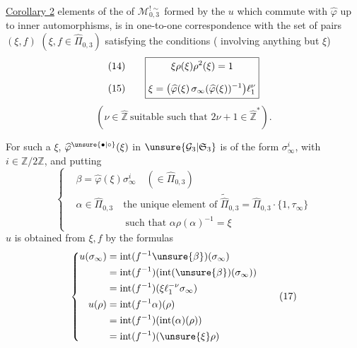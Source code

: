 
\uline{Corollary 2}  elements of the  of
$\mathcal M_{0,3}^{!\sim}$ formed by the $u$ which commute with
$\widehat\varphi$ up to inner automorphisms, is  in one-to-one correspondence with
the set of pairs $(\xi,f)$ \deleted{\unsure{$\in$}}
$(\xi,f\in\widehat\Pi_{0,3})$ satisfying the conditions
( involving anything but $\xi$)
\[
\begin{array}{c@{\qquad}c}
\begin{gathered}(14)\\[1.8ex](15)\end{gathered}
&
\boxed{\begin{gathered}
\xi\rho(\xi)\rho^2(\xi)=1\\[1.8ex]
\xi=\bigl(\widehat\varphi(\xi)\,
\sigma_\infty(\widehat\varphi(\xi))^{-1}\bigr)\ell_1^\nu
\end{gathered}}
\end{array}
\]
\[
(\nu\in\widehat{\mathbb Z}\ \text{suitable such that }
2\nu+1\in\widehat{\mathbb Z}^{*}).
\]

For such a $\xi$, $\widehat\varphi^{\unsure{\bullet|\circ}}(\xi)$
in $\unsure{\mathcal G_3|\mathfrak S_3}$ is of the form
$\sigma_\infty^i$, with $i\in\mathbb Z/2\mathbb Z$, and putting
\[
\left\{\begin{aligned}
&\beta=\widehat\varphi(\xi)\sigma_\infty^i
  \quad(\in\widehat\Pi_{0,3})\\
&\alpha\in\widehat\Pi_{0,3}\quad
  \text{the unique element of }\widetilde{\widehat\Pi}_{0,3}
  =\widehat\Pi_{0,3}\cdot\{1,\tau_\infty\}\\
&\hspace{5em}\text{such that }\alpha\rho(\alpha)^{-1}=\xi
\end{aligned}\right.
\tag{16}
\]
$u$ is obtained from $\xi,f$ by the formulas
\[
\left\{\begin{aligned}
u(\sigma_\infty)
 &=\operatorname{int}(f^{-1}\unsure{\beta})(\sigma_\infty)\\
 &=\operatorname{int}(f^{-1})(\operatorname{int}(\unsure{\beta})(\sigma_\infty))\\
 &=\operatorname{int}(f^{-1})(\xi\ell_1^{-\nu}\sigma_\infty)\\
u(\rho)
 &=\operatorname{int}(f^{-1}\alpha)(\rho)\\
 &=\operatorname{int}(f^{-1})(\operatorname{int}(\alpha)(\rho))\\
 &=\operatorname{int}(f^{-1})(\unsure{\xi}\rho)
\end{aligned}\right.
\tag{17}
\]

